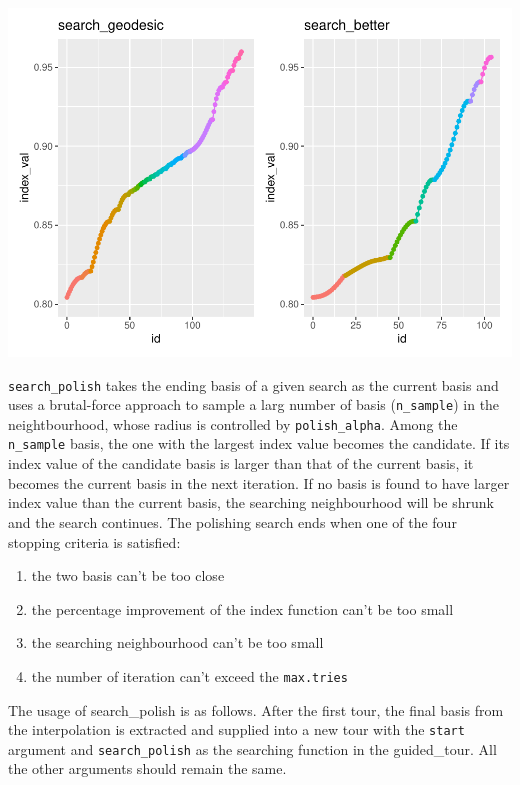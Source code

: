 \documentclass[12pt]{article}
\providecommand{\tightlist}{%
  \setlength{\itemsep}{0pt}\setlength{\parskip}{0pt}}
\begin{document}
\includegraphics{paper_files/figure-latex/trace-compare-1.pdf}

\texttt{search\_polish} takes the ending basis of a given search as the
current basis and uses a brutal-force approach to sample a larg number
of basis (\texttt{n\_sample}) in the neightbourhood, whose radius is
controlled by \texttt{polish\_alpha}. Among the \texttt{n\_sample}
basis, the one with the largest index value becomes the candidate. If
its index value of the candidate basis is larger than that of the
current basis, it becomes the current basis in the next iteration. If no
basis is found to have larger index value than the current basis, the
searching neighbourhood will be shrunk and the search continues. The
polishing search ends when one of the four stopping criteria is
satisfied:

\begin{enumerate}
\def\labelenumi{\arabic{enumi})}
\tightlist
\item
  the two basis can't be too close
\item
  the percentage improvement of the index function can't be too small
\item
  the searching neighbourhood can't be too small
\item
  the number of iteration can't exceed the \texttt{max.tries}
\end{enumerate}

The usage of search\_polish is as follows. After the first tour, the
final basis from the interpolation is extracted and supplied into a new
tour with the \texttt{start} argument and \texttt{search\_polish} as the
searching function in the guided\_tour. All the other arguments should
remain the same.
\end{document}
